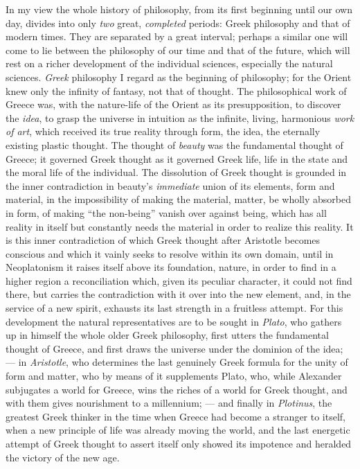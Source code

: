 \documentclass[12pt,a4paper,openany]{book}
\newcommand{\opage}[1]{\marginnote{\footnotesize\textit{[#1]}}}
\begin{document}
In my view the whole history of philosophy, from its first beginning
until our own day, divides into only \emph{two} great, \emph{completed}
periods: Greek philosophy and that of modern times. They are separated
by a great interval; perhaps a similar one will come to lie between the
philosophy of our time and that of the future, which will rest on a
richer development of the individual sciences, especially the natural
sciences. \emph{Greek} philosophy I regard as the beginning of
philosophy; for the Orient knew only the infinity of fantasy, not that
of thought. The philosophical work of Greece was, with the nature-life
of the Orient as its presupposition, to discover the \emph{idea}, to
grasp the universe in intuition as the infinite, living, harmonious
\emph{work of art}, which received its true reality through form, the
idea, the eternally existing plastic thought. The thought of
\emph{beauty} was the fundamental thought of Greece; it governed Greek
thought as it governed Greek life, life in the state and the moral life
of the individual. The dissolution of Greek thought is grounded in the
inner contradiction in beauty's \emph{immediate} union of its elements,
form and material, in the impossibility of making the material, matter,
be wholly absorbed in form, of making ``the non-being'' vanish over
against being, which has all reality in itself but constantly needs the
material in order to realize this reality. It is this inner
contradiction of which Greek thought after Aristotle becomes conscious
and which it vainly seeks to resolve within its own domain, until in
Neoplatonism it raises itself above its
\opage{4}foundation, nature, in order to find in a higher region a
reconciliation which, given its peculiar character, it could not find
there, but carries the contradiction with it over into the new element,
and, in the service of a new spirit, exhausts its last strength in a
fruitless attempt. For this development the natural representatives are
to be sought in \emph{Plato}, who gathers up in himself the whole older
Greek philosophy, first utters the fundamental thought of Greece, and
first draws the universe under the dominion of the idea; --- in
\emph{Aristotle}, who determines the last genuinely Greek formula for the
unity of form and matter, who by means of it supplements Plato, who,
while Alexander subjugates a world for Greece, wins the riches of a world
for Greek thought, and with them gives nourishment to a millennium; ---
and finally in \emph{Plotinus}, the greatest Greek thinker in the time
when Greece had become a stranger to itself, when a new principle of
life was already moving the world, and the last energetic attempt of
Greek thought to assert itself only showed its impotence and heralded
the victory of the new age.
\end{document}

